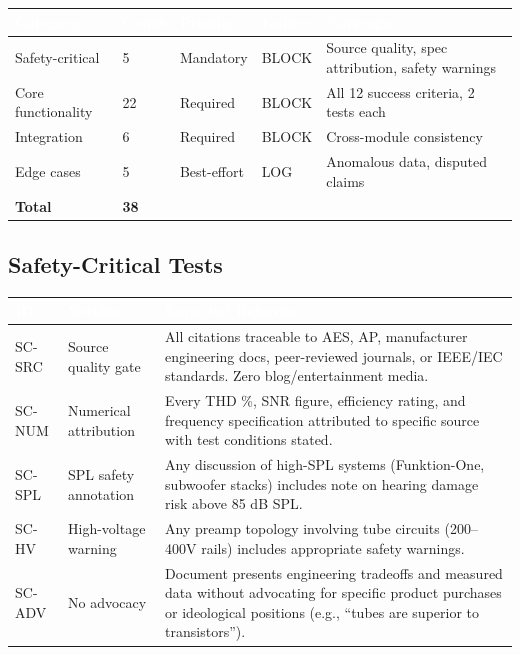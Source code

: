 \documentclass[11pt,letterpaper]{article}
\newcommand{\tableheader}[1]{\textbf{\sffamily\textcolor{white}{#1}}}
\begin{document}
\begin{center}
\begin{tabularx}{\textwidth}{L{3cm}C{1.5cm}C{2cm}C{2cm}X}
\toprule
{}
\tableheader{Category} & \tableheader{Count} & \tableheader{Priority} & \tableheader{Failure} & \tableheader{Coverage} \\
\midrule
Safety-critical & 5 & Mandatory & BLOCK & Source quality, spec attribution, safety warnings \\
Core functionality & 22 & Required & BLOCK & All 12 success criteria, 2 tests each \\
Integration & 6 & Required & BLOCK & Cross-module consistency \\
Edge cases & 5 & Best-effort & LOG & Anomalous data, disputed claims \\
\midrule
\textbf{Total} & \textbf{38} & & & \\
\bottomrule
\end{tabularx}
\end{center}

\subsection{Safety-Critical Tests}

\begin{center}
\begin{tabularx}{\textwidth}{L{1.5cm}L{4cm}X}
\toprule
{}
\tableheader{ID} & \tableheader{Verifies} & \tableheader{Expected Behavior} \\
\midrule
SC-SRC & Source quality gate & All citations traceable to AES, AP, manufacturer engineering docs, peer-reviewed journals, or IEEE/IEC standards. Zero blog/entertainment media. \\
SC-NUM & Numerical attribution & Every THD \%, SNR figure, efficiency rating, and frequency specification attributed to specific source with test conditions stated. \\
SC-SPL & SPL safety annotation & Any discussion of high-SPL systems (Funktion-One, subwoofer stacks) includes note on hearing damage risk above 85 dB SPL. \\
SC-HV & High-voltage warning & Any preamp topology involving tube circuits (200--400V rails) includes appropriate safety warnings. \\
SC-ADV & No advocacy & Document presents engineering tradeoffs and measured data without advocating for specific product purchases or ideological positions (e.g., ``tubes are superior to transistors''). \\
\bottomrule
\end{tabularx}
\end{center}
\end{document}
